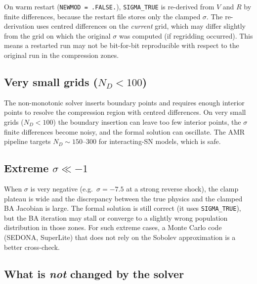 \documentclass[11pt]{article}
\begin{document}
On warm restart (\texttt{NEWMOD = .FALSE.}), \texttt{SIGMA\_TRUE} is
re-derived from $V$ and $R$ by finite differences, because the restart
file stores only the clamped $\sigma$.  The re-derivation uses centred
differences on the \emph{current} grid, which may differ slightly from
the grid on which the original $\sigma$ was computed (if regridding
occurred).  This means a restarted run may not be bit-for-bit
reproducible with respect to the original run in the compression zones.

\subsection{Very small grids (\texorpdfstring{$N_D < 100$}{ND < 100})}

The non-monotonic solver inserts boundary points and requires enough
interior points to resolve the compression region with centred
differences.  On very small grids ($N_D < 100$) the boundary insertion
can leave too few interior points, the $\sigma$ finite differences
become noisy, and the formal solution can oscillate.  The AMR pipeline
targets $N_D \sim 150$--$300$ for interacting-SN models, which is safe.

\subsection{Extreme \texorpdfstring{$\sigma \ll -1$}{sigma << -1}}

When $\sigma$ is very negative (e.g.\ $\sigma = -7.5$ at a strong
reverse shock), the clamp plateau is wide and the discrepancy between
the true physics and the clamped BA Jacobian is large.  The formal
solution is still correct (it uses \texttt{SIGMA\_TRUE}), but the BA
iteration may stall or converge to a slightly wrong population
distribution in those zones.  For such extreme cases, a Monte Carlo
code (SEDONA, SuperLite) that does not rely on the Sobolev approximation
is a better cross-check.

\subsection{What is \emph{not} changed by the solver}
\end{document}
